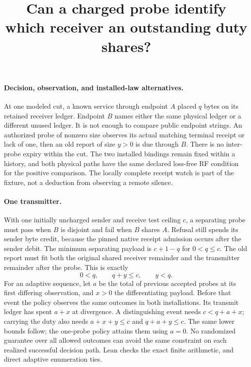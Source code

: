 \documentclass{article}
\title{Can a charged probe identify which receiver an outstanding duty shares?}
\author{}\date{}
\begin{document}
\maketitle

\paragraph{Decision, observation, and installed-law alternatives.}
At one modeled cut, a known service through endpoint $A$ placed $q$ bytes
on its retained receiver ledger. Endpoint $B$ names either the
same physical ledger or a different unused ledger. It is not enough
to compare public endpoint strings. An authorized probe of nonzero
size observes its actual matching terminal receipt or lack of one,
then an old report of size $y>0$ is due through $B$.
There is no inter-probe expiry within the cut. The two installed
bindings remain fixed within a history, and both physical paths have
the same declared loss-free RF condition for the positive comparison.
The locally complete receipt watch is part of the fixture, not a
deduction from observing a remote silence.

\paragraph{One transmitter.}
With one initially uncharged sender and receive test ceiling $c$, a
separating probe must pass when $B$ is disjoint and fail when $B$
shares $A$. Refusal still spends its sender byte credit, because the
pinned native receipt admission occurs after the sender debit. The
minimum separating payload is $c+1-q$ for $0<q\le c$.
The old report must fit both the original shared receiver remainder
and the transmitter remainder after the probe. This is exactly
\[
             0<q,\qquad q+y\le c,\qquad y<q.
\]
For an adaptive sequence, let $a$ be the total of previous accepted
probes at its first differing observation, and $x>0$ the
differentiating payload. Before that event the policy observes the
same outcomes in both installations. Its transmit ledger has spent
$a+x$ at divergence. A distinguishing event needs $c<q+a+x$;
carrying the duty also needs $a+x+y\le c$ and $q+a+y\le c$.
The same lower bounds follow; the one-probe policy attains them using
$a=0$. No randomized guarantee over all allowed outcomes can avoid the
same constraint on each realized successful decision path. Lean checks
the exact finite arithmetic, and direct adaptive enumeration ties.
\end{document}
